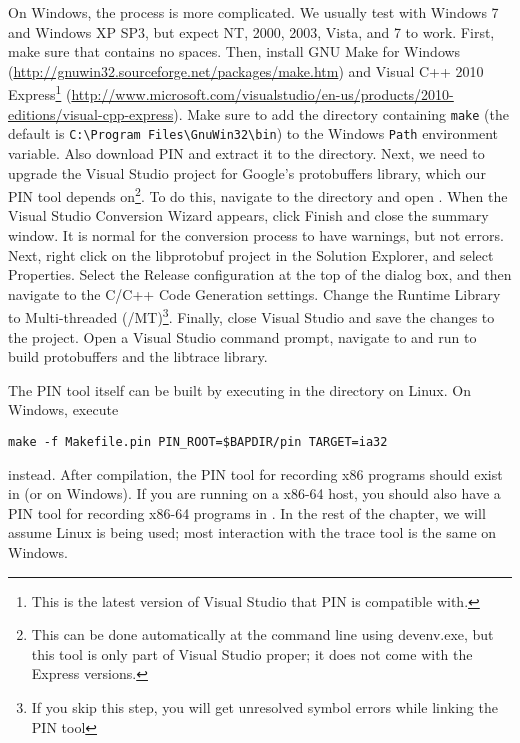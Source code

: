 On Windows, the process is more complicated.  We usually test with
Windows 7 and Windows XP SP3, but expect NT, 2000, 2003, Vista, and 7
to work.  First, make sure that  contains no
spaces. Then, install GNU Make for Windows
(\url{http://gnuwin32.sourceforge.net/packages/make.htm}) and Visual
C++ 2010 Express\footnote{This is the latest version of Visual Studio
  that PIN is compatible with.}
(\url{http://www.microsoft.com/visualstudio/en-us/products/2010-editions/visual-cpp-express}).
Make sure to add the directory containing \texttt{make} (the default
is \verb!C:\Program Files\GnuWin32\bin!) to the Windows \texttt{Path}
environment variable.  Also download PIN and extract it to the
 directory.  Next, we need to upgrade the Visual
Studio project for Google's protobuffers library, which our PIN tool
depends on\footnote{This can be done automatically at the command line
  using devenv.exe, but this tool is only part of Visual Studio
  proper; it does not come with the Express versions.}.  To do this,
navigate to the
 directory
and open .  When the Visual Studio Conversion
Wizard appears, click Finish and close the summary window.  It is
normal for the conversion process to have warnings, but not errors.
Next, right click on the libprotobuf project in the Solution Explorer,
and select Properties.  Select the Release configuration at the top of
the dialog box, and then navigate to the C/C++ Code Generation
settings.  Change the Runtime Library to Multi-threaded
(/MT)\footnote{If you skip this step, you will get unresolved symbol
  errors while linking the PIN tool}.  Finally, close Visual Studio
and save the changes to the project.  Open a Visual Studio command
prompt, navigate to 
and run  to build protobuffers and
the libtrace library.

The PIN tool itself can be built by executing  in the
 directory on Linux.  On Windows, execute
\begin{verbatim}
make -f Makefile.pin PIN_ROOT=$BAPDIR/pin TARGET=ia32
\end{verbatim}
instead. After compilation, the PIN tool for recording x86 programs
should exist in  (or
 on Windows).  If you are running on a x86-64
host, you should also have a PIN tool for recording x86-64 programs in
.  In the rest of
the chapter, we will assume Linux is being used; most interaction with
the trace tool is the same on Windows.


